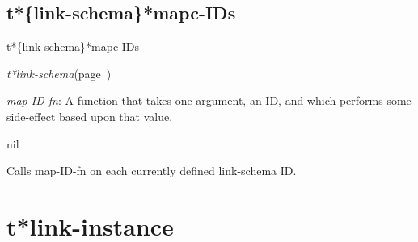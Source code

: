 \subsection{t*\{link-schema\}*mapc-IDs}
\label{t*link-schema*mapc-IDs}

\begin{description}
\item [Name:]  t*\{link-schema\}*mapc-IDs

\item [Class:] {\sl t*link-schema}\hfill(page~\pageref{t*link-schema})

\item [Parameters:]
\item {\sl map-ID-fn}:  A function that takes one argument, an ID,
and which performs some side-effect based upon that
value.



\item [Return-value:] nil

\item [Description:]

Calls map-ID-fn on each currently defined link-schema ID.

\item [Public:]



\end{description}
\horizontalline

\section{t*link-instance}
\label{t*link-instance}

